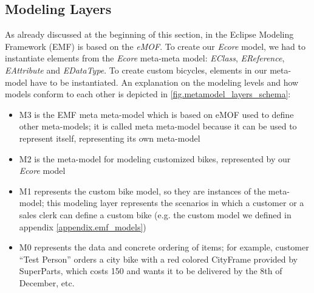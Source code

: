 \subsection{Modeling Layers}
\noindent As already discussed at the beginning of this section, in the Eclipse
Modeling Framework (EMF) is based on the \emph{eMOF}. To create our \emph{Ecore} model,
we had to instantiate elements from the \emph{Ecore} meta-meta model:
\emph{EClass}, \emph{EReference}, \emph{EAttribute} and \emph{EDataType}. To create custom
bicycles, elements in our meta-model have to be instantiated. An explanation on
the modeling levels and how models conform to each other is depicted in
\ref{fig.metamodel_layers_schema}:
\begin{itemize}
  \item{M3} is the EMF meta meta-model which is based on eMOF used to
  define other meta-models; it is called meta meta-model because it can be used to
  represent itself, representing its own meta-model
  \item{M2} is the meta-model for modeling customized bikes, represented by
  our \emph{Ecore} model
  \item{M1} represents the custom bike model, so they are instances of the
  meta-model; this modeling layer represents the scenarios in which a customer
  or a sales clerk can define a custom bike (e.g. the custom model we defined
  in appendix \ref{appendix.emf_models})
  \item{M0} represents the data and concrete ordering of items; for example,
  customer ``Test Person'' orders a city bike with a red colored CityFrame
  provided by SuperParts, which costs 150 and wants it to be delivered by the
  8th of December, etc.
\end{itemize} 
